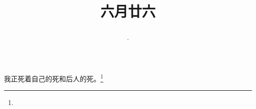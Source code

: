 \title{\date[d=31,m=7,y=2024][year:cn-y,年,month:cn,day:cn,日,·,weekday]·六月廿六 }
我正死着自己的死和后人的死。\footnote{ }


